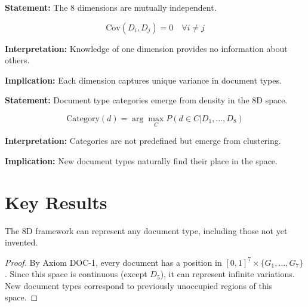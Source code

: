 \begin{tcolorbox}[colback=gray!5!white, colframe=gray!75!black,
    title=Axiom DOC-2: Dimension Independence]
\textbf{Statement:} The 8 dimensions are mutually independent.

\begin{equation}
\text{Cov}(D_i, D_j) = 0 \quad \forall i \neq j
\end{equation}

\textbf{Interpretation:} Knowledge of one dimension provides no information about others.

\textbf{Implication:} Each dimension captures unique variance in document types.
\end{tcolorbox}

\begin{tcolorbox}[colback=gray!5!white, colframe=gray!75!black,
    title=Axiom DOC-3: Cluster Emergence]
\textbf{Statement:} Document type categories emerge from density in the 8D space.

\begin{equation}
\text{Category}(d) = \arg\max_C P(d \in C | D_1, ..., D_8)
\end{equation}

\textbf{Interpretation:} Categories are not predefined but emerge from clustering.

\textbf{Implication:} New document types naturally find their place in the space.
\end{tcolorbox}


\section{Key Results}
\label{sec:doctype-results}

\begin{proposition}[Universality]
The 8D framework can represent any document type, including those not yet invented.
\end{proposition}

\begin{proof}
By Axiom DOC-1, every document has a position in $[0,1]^7 \times \{G_1,...,G_7\}$.
Since this space is continuous (except $D_5$), it can represent infinite variations.
New document types correspond to previously unoccupied regions of this space.
\end{proof}

